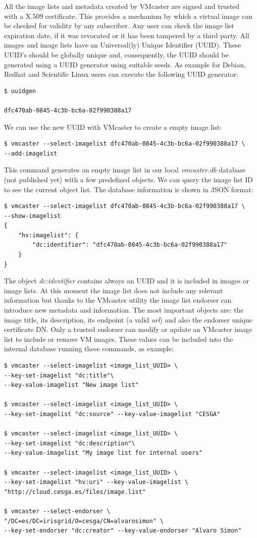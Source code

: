 \documentclass{cai}
\begin{document}
All the image lists and metadata created by VMcaster are signed and trusted with a X.509 certificate.
This provides a mechanism by which a virtual image can be checked for validity by any subscriber. Any user can check the image list expiration date, if it was revocated or it has been tampered by a third party.
All images and image lists have an Universal(ly) Unique Identifier (UUID). These UUID's should be globally unique and, consequently, the UUID should be generated using a UUID generator using suitable seeds. As example for Debian, Redhat and Scientific Linux users can execute the following UUID generator:
\begin{verbatim}
$ uuidgen

dfc470ab-0845-4c3b-bc6a-02f990388a17
\end{verbatim}
We can use the new UUID with VMcaster to create a empty image list:
\begin{verbatim}
$ vmcaster --select-imagelist dfc470ab-0845-4c3b-bc6a-02f990388a17 \
--add-imagelist
\end{verbatim}
This command generates an empty image list in our local \textit{vmcaster.db} database (not published yet) with a few predefined objects. We can query the image list ID to see the current object list.
The database information is shown in JSON format:
\begin{verbatim}
$ vmcaster --select-imagelist dfc470ab-0845-4c3b-bc6a-02f990388a17 \
--show-imagelist
{
    "hv:imagelist": {
        "dc:identifier": "dfc470ab-0845-4c3b-bc6a-02f990388a17"
    }
}
\end{verbatim}
The object \textit{dc:identifier} contains always an UUID and it is included in images or image lists. 
At this moment the image list does not include any relevant information but thanks to the VMcaster utility the image list endorser can introduce new metadata and information.
The most important objects are: the image title, its description, its endpoint (a valid \textit{url}) and also the endorser unique certificate DN. Only a trusted endorser can modify or update an VMcaster image list to include or remove VM images. 
These values can be included into the internal database running these commands, as example:
\begin{verbatim}
$ vmcaster --select-imagelist <image_list_UUID> \
--key-set-imagelist "dc:title"\ 
--key-value-imagelist "New image list"

$ vmcaster --select-imagelist <image_list_UUID> \ 
--key-set-imagelist "dc:source" --key-value-imagelist "CESGA"

$ vmcaster --select-imagelist <image_list_UUID> \ 
--key-set-imagelist "dc:description"\ 
--key-value-imagelist "My image list for internal users"

$ vmcaster --select-imagelist <image_list_UUID> \ 
--key-set-imagelist "hv:uri" --key-value-imagelist \ 
"http://cloud.cesga.es/files/image.list"

$ vmcaster --select-endorser \ 
"/DC=es/DC=irisgrid/O=cesga/CN=alvarosimon" \
--key-set-endorser "dc:creator" --key-value-endorser "Alvaro Simon"
\end{verbatim}
\end{document}
